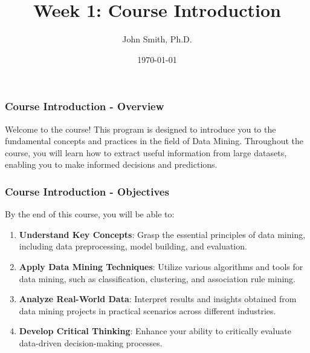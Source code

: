 \documentclass[aspectratio=169]{beamer}
\title[Course Introduction]{Week 1: Course Introduction}
\author[J. Smith]{John Smith, Ph.D.}
\institute[University Name]{
  Department of Computer Science\\
  University Name\\
  \vspace{0.3cm}
  Email: email@university.edu\\
  Website: www.university.edu
}
\date{\today}
\begin{document}
\frame{\titlepage}

\begin{frame}[fragile]
    \frametitle{Course Introduction - Overview}
    Welcome to the course! This program is designed to introduce you to the fundamental concepts and practices in the field of Data Mining. 
    Throughout the course, you will learn how to extract useful information from large datasets, enabling you to make informed decisions and predictions.
\end{frame}

\begin{frame}[fragile]
    \frametitle{Course Introduction - Objectives}
    By the end of this course, you will be able to:
    \begin{enumerate}
        \item \textbf{Understand Key Concepts}: Grasp the essential principles of data mining, including data preprocessing, model building, and evaluation.
        \item \textbf{Apply Data Mining Techniques}: Utilize various algorithms and tools for data mining, such as classification, clustering, and association rule mining.
        \item \textbf{Analyze Real-World Data}: Interpret results and insights obtained from data mining projects in practical scenarios across different industries.
        \item \textbf{Develop Critical Thinking}: Enhance your ability to critically evaluate data-driven decision-making processes.
    \end{enumerate}
\end{frame}
\end{document}
